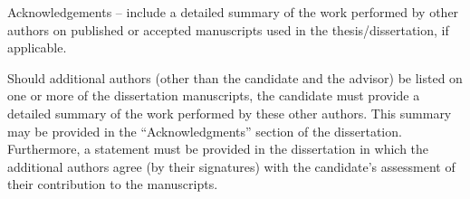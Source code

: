 

Acknowledgements – include a detailed summary of the work performed by other
authors on published or accepted manuscripts used in the thesis/dissertation,
if applicable.

Should additional authors (other than the candidate and the advisor) be listed on
one or more of the dissertation manuscripts, the candidate must provide a
detailed summary of the work performed by these other authors.
This summary may be provided in the “Acknowledgments” section of the dissertation.
Furthermore, a statement must be provided in the dissertation in which the
additional authors agree (by their signatures) with the candidate’s assessment of
their contribution to the manuscripts.
